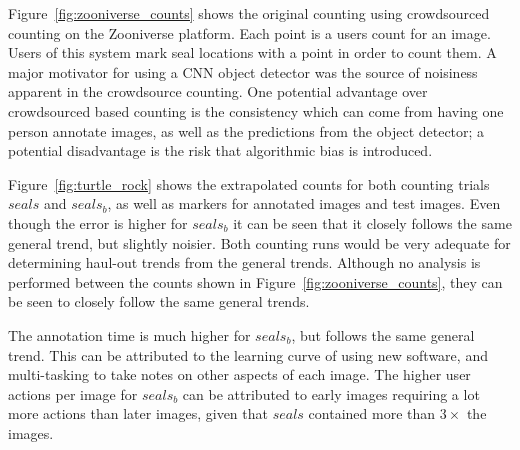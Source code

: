   Figure~\ref{fig:zooniverse_counts} shows the original counting using crowdsourced counting on the Zooniverse \cite{Zooniverse} platform. Each point is a users count for an image. Users of this system mark seal locations with a point in order to count them. A major motivator for using a \gls{CNN} object detector was the source of noisiness apparent in the crowdsource counting. One potential advantage over crowdsourced based counting is the consistency which can come from having one person annotate images, as well as the predictions from the object detector; a potential disadvantage is the risk that algorithmic bias is introduced.
  
  Figure~\ref{fig:turtle_rock} shows the extrapolated counts for both counting trials $seals$ and $seals_b$, as well as markers for annotated images and test images. Even though the error is higher for $seals_b$ it can be seen that it closely follows the same general trend, but slightly noisier. Both counting runs would be very adequate for determining haul-out trends from the general trends. Although no analysis is performed between the counts shown in Figure~\ref{fig:zooniverse_counts}, they can be seen to closely follow the same general trends.
  
  The annotation time is much higher for $seals_b$, but follows the same general trend. This can be attributed to the learning curve of using new software, and multi-tasking to take notes on other aspects of each image. The higher user actions per image for $seals_b$ can be attributed to early images requiring a lot more actions than later images, given that $seals$ contained more than $3\times$ the images.

